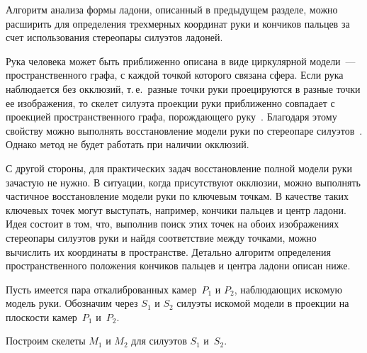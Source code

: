 \begin{multicols}{2}
Алгоритм анализа формы ладони, описанный в предыдущем разделе,
можно расширить для определения трехмерных координат руки и 
кончиков пальцев за счет использования стереопары силуэтов ладоней.

Рука человека может быть приближенно описана в виде циркулярной модели~--- 
пространственного графа, с каждой точкой которого связана сфера.
Если рука наблюдается без окклюзий, т.\,е.\ разные точки руки проецируются в 
разные точки ее изображения,
то скелет силуэта проекции руки приближенно совпадает с проекцией 
пространственного графа, порождающего руку~\cite{GeneralizedCylinders1995}.
Благодаря этому свойству можно выполнять восстановление модели руки по 
стереопаре силуэтов~\cite{Tsiskaridze2009, Tsiskaridze2010}.
Однако метод не будет работать при наличии окклюзий.

С другой стороны, для практических задач восстановление полной модели руки зачастую не нужно.
В ситуации, когда присутствуют окклюзии, можно выполнять частичное восстановление 
модели руки по ключевым точкам.
В качестве таких ключевых точек могут выступать, например, кончики пальцев и центр ладони.
Идея состоит в том, что, выполнив поиск этих точек на обоих изображениях стереопары 
силуэтов руки и найдя соответствие между точками, можно вычислить их координаты в пространстве.
Детально алгоритм определения пространственного положения кончиков пальцев и центра ладони 
описан ниже.

Пусть имеется пара откалиброванных камер~$P_1$ и $P_2$, наблюдающих искомую модель руки.
Обозначим через $S_1$ и $S_2$ силуэты искомой модели в проекции на плоскости камер~$P_1$ 
и~$P_2$.

Построим скелеты $M_1$ и $M_2$ для силуэтов $S_1$ и~$S_2$.

\setcounter{figure}{4}
\begin{figure*}[b] %
 \vspace*{6pt}
 \begin{center}
 \mbox{%
 \epsfxsize=136.269mm
 }
 \end{center}
 \vspace*{-9pt}
 \vspace*{15pt}
 \begin{center}
 \mbox{%
 \epsfxsize=162.029mm
 }
 \end{center}
 \vspace*{-9pt}
\end{figure*}


\end{multicols}
